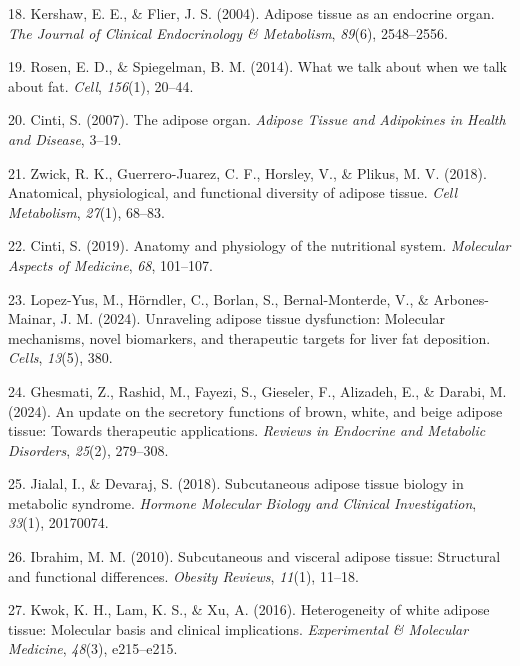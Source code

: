 \documentclass[
  11pt,
  letterpaper,
]{book}
\newlength{\cslhangindent}
\newenvironment{CSLReferences}[2] %
 {\begin{list}{}{%
  \setlength{\itemindent}{0pt}
  \setlength{\leftmargin}{0pt}
  \setlength{\parsep}{0pt}
  \ifodd #1
   \setlength{\leftmargin}{\cslhangindent}
   \setlength{\itemindent}{-1\cslhangindent}
  \fi
  \setlength{\itemsep}{#2\baselineskip}}}
 {\end{list}}
\begin{document}
\begin{CSLReferences}{1}{0}
18. Kershaw, E. E., \& Flier, J. S. (2004). Adipose tissue as an
endocrine organ. \emph{The Journal of Clinical Endocrinology \&
Metabolism}, \emph{89}(6), 2548--2556.

19. Rosen, E. D., \& Spiegelman, B. M. (2014). What we talk about when
we talk about fat. \emph{Cell}, \emph{156}(1), 20--44.

20. Cinti, S. (2007). The adipose organ. \emph{Adipose Tissue and
Adipokines in Health and Disease}, 3--19.

21. Zwick, R. K., Guerrero-Juarez, C. F., Horsley, V., \& Plikus, M. V.
(2018). Anatomical, physiological, and functional diversity of adipose
tissue. \emph{Cell Metabolism}, \emph{27}(1), 68--83.

22. Cinti, S. (2019). Anatomy and physiology of the nutritional system.
\emph{Molecular Aspects of Medicine}, \emph{68}, 101--107.

23. Lopez-Yus, M., Hörndler, C., Borlan, S., Bernal-Monterde, V., \&
Arbones-Mainar, J. M. (2024). Unraveling adipose tissue dysfunction:
Molecular mechanisms, novel biomarkers, and therapeutic targets for
liver fat deposition. \emph{Cells}, \emph{13}(5), 380.

24. Ghesmati, Z., Rashid, M., Fayezi, S., Gieseler, F., Alizadeh, E., \&
Darabi, M. (2024). An update on the secretory functions of brown, white,
and beige adipose tissue: Towards therapeutic applications.
\emph{Reviews in Endocrine and Metabolic Disorders}, \emph{25}(2),
279--308.

25. Jialal, I., \& Devaraj, S. (2018). Subcutaneous adipose tissue
biology in metabolic syndrome. \emph{Hormone Molecular Biology and
Clinical Investigation}, \emph{33}(1), 20170074.

26. Ibrahim, M. M. (2010). Subcutaneous and visceral adipose tissue:
Structural and functional differences. \emph{Obesity Reviews},
\emph{11}(1), 11--18.

27. Kwok, K. H., Lam, K. S., \& Xu, A. (2016). Heterogeneity of white
adipose tissue: Molecular basis and clinical implications.
\emph{Experimental \& Molecular Medicine}, \emph{48}(3), e215--e215.


\end{CSLReferences}
\end{document}
